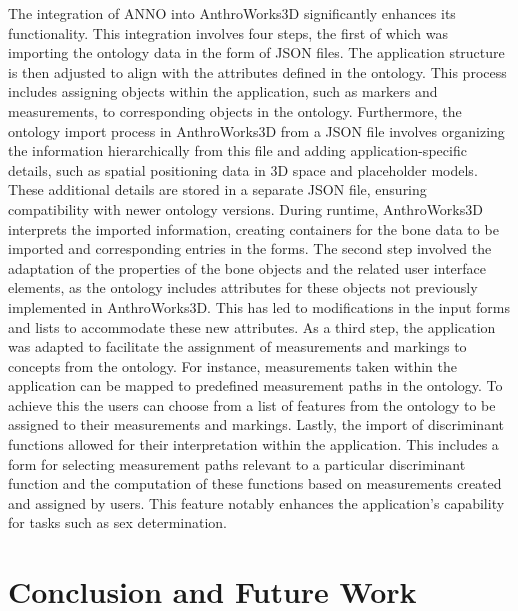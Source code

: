 \documentclass[sw]{iosart2x}
\newcommand{\aw}{AnthroWorks3D}
\begin{document}
The integration of ANNO into \aw{} significantly enhances its functionality.
This integration involves four steps, the first of which was importing the ontology data in the form of JSON files.
The application structure is then adjusted to align with the attributes defined in the ontology.
This process includes assigning objects within the application, such as markers and measurements, to corresponding objects in the ontology.
Furthermore, the ontology import process in \aw{} from a JSON file involves organizing the information hierarchically from this file and adding application-specific details, such as spatial positioning data in 3D space and placeholder models.
These additional details are stored in a separate JSON file, ensuring compatibility with newer ontology versions.
During runtime, \aw{} interprets the imported information, creating containers for the bone data to be imported and corresponding entries in the forms.
The second step involved the adaptation of the properties of the bone objects and the related user interface elements, as the ontology includes attributes for these objects not previously implemented in \aw{}.
This has led to modifications in the input forms and lists to accommodate these new attributes.
As a third step, the application was adapted to facilitate the assignment of measurements and markings to concepts from the ontology.
For instance, measurements taken within the application can be mapped to predefined measurement paths in the ontology.
To achieve this the users can choose from a list of features from the ontology to be assigned to their measurements and markings.
Lastly, the import of discriminant functions allowed for their interpretation within the application.
This includes a form for selecting measurement paths relevant to a particular discriminant function and the computation of these functions based on measurements created and assigned by users.
This feature notably enhances the application's capability for tasks such as sex determination.


\section{Conclusion and Future Work}
\end{document}
